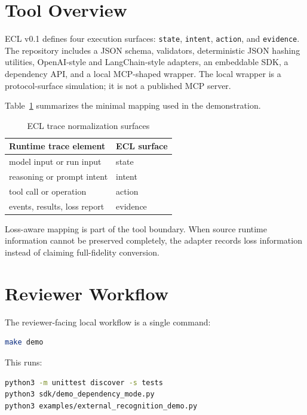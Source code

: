 \documentclass[10pt,conference]{IEEEtran}
\begin{document}
\section{Tool Overview}

ECL v0.1 defines four execution surfaces: \texttt{state}, \texttt{intent}, \texttt{action}, and \texttt{evidence}. The repository includes a JSON schema, validators, deterministic JSON hashing utilities, OpenAI-style and LangChain-style adapters, an embeddable SDK, a dependency API, and a local MCP-shaped wrapper. The local wrapper is a protocol-surface simulation; it is not a published MCP server.

Table~\ref{tab:surface} summarizes the minimal mapping used in the demonstration.

\begin{table}[ht]
\caption{ECL trace normalization surfaces}
\label{tab:surface}
\centering
\begin{tabular}{ll}
\toprule
Runtime trace element & ECL surface \\
\midrule
model input or run input & state \\
reasoning or prompt intent & intent \\
tool call or operation & action \\
events, results, loss report & evidence \\
\bottomrule
\end{tabular}
\end{table}

Loss-aware mapping is part of the tool boundary. When source runtime information cannot be preserved completely, the adapter records loss information instead of claiming full-fidelity conversion.

\section{Reviewer Workflow}

The reviewer-facing local workflow is a single command:

\begin{lstlisting}[language=bash]
make demo
\end{lstlisting}

This runs:

\begin{lstlisting}[language=bash]
python3 -m unittest discover -s tests
python3 sdk/demo_dependency_mode.py
python3 examples/external_recognition_demo.py
\end{lstlisting}
\end{document}
